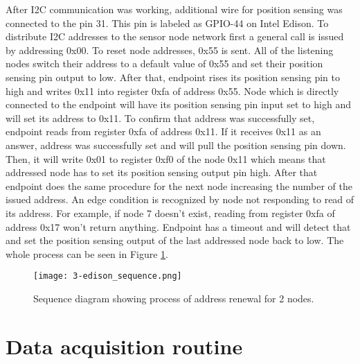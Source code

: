 After \ac{I2C} communication was working, additional wire for position sensing was connected to the pin 31. This pin is labeled as GPIO-44 on Intel Edison. To distribute \ac{I2C} addresses to the sensor node network first a general call is issued by addressing 0x00. To reset node addresses, 0x55 is sent. All of the listening nodes switch their address to a default value of 0x55 and set their position sensing pin output to low. After that, endpoint rises its position sensing pin to high and writes 0x11 into register 0xfa of address 0x55. Node which is directly connected to the endpoint will have its position sensing pin input set to high and will set its address to 0x11. To confirm that address was successfully set, endpoint reads from register 0xfa of address 0x11. If it receives 0x11 as an answer, address was successfully set and will pull the position sensing pin down. Then, it will write 0x01 to register 0xf0 of the node 0x11 which means that addressed node has to set its position sensing output pin high. After that endpoint does the same procedure for the next node increasing the number of the issued address. An edge condition is recognized by node not responding to read of its address. For example, if node 7 doesn't exist, reading from register 0xfa of address 0x17 won't return anything. Endpoint has a timeout and will detect that and set the position sensing output of the last addressed node back to low. The whole process can be seen in Figure \ref{fig:endpoint_sequence}.

\begin{figure}[h]
  \begin{center}
    \texttt{[image: 3-edison\_sequence.png]}
  \end{center}
  \caption{Sequence diagram showing process of address renewal for 2 nodes.}
  \label{fig:endpoint_sequence}
\end{figure}

\section{Data acquisition routine}

